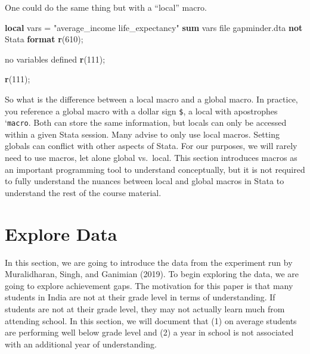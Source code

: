 \documentclass[
]{book}
\newenvironment{Shaded}{\begin{snugshade}}{\end{snugshade}}
\newcommand{\FunctionTok}[1]{\textcolor[rgb]{0.13,0.29,0.53}{\textbf{#1}}}
\newcommand{\KeywordTok}[1]{\textcolor[rgb]{0.13,0.29,0.53}{\textbf{#1}}}
\newcommand{\NormalTok}[1]{#1}
\newcommand{\OtherTok}[1]{\textcolor[rgb]{0.56,0.35,0.01}{#1}}
\newcommand{\StringTok}[1]{\textcolor[rgb]{0.31,0.60,0.02}{#1}}
\begin{document}
\begin{Shaded}
\end{Shaded}

One could do the same thing but with a ``local'' macro.

\begin{Shaded}
\begin{Highlighting}[]
\KeywordTok{local}\NormalTok{ vars = }\StringTok{"average\_income life\_expectancy"}
\KeywordTok{sum} \OtherTok{\textasciigrave{}vars\textquotesingle{}}
\NormalTok{file gapminder.dta }\KeywordTok{not}\NormalTok{ Stata }\KeywordTok{format}
\FunctionTok{r}\NormalTok{(610);}



\NormalTok{no variables defined}
\FunctionTok{r}\NormalTok{(111);}

\FunctionTok{r}\NormalTok{(111);}
\end{Highlighting}
\end{Shaded}

So what is the difference between a local macro and a global macro. In practice, you reference a global macro with a dollar sign \texttt{\$}, a local with apostrophes `\texttt{macro\textquotesingle{}}. Both can store the same information, but locals can only be accessed within a given Stata session. Many advise to only use local macros. Setting globals can conflict with other aspects of Stata. For our purposes, we will rarely need to use macros, let alone global vs.~local. This section introduces macros as an important programming tool to understand conceptually, but it is not required to fully understand the nuances between local and global macros in Stata to understand the rest of the course material.

\section{Explore Data}\label{explore-data}

In this section, we are going to introduce the data from the experiment run by Muralidharan, Singh, and Ganimian (2019). To begin exploring the data, we are going to explore achievement gaps. The motivation for this paper is that many students in India are not at their grade level in terms of understanding. If students are not at their grade level, they may not actually learn much from attending school. In this section, we will document that (1) on average students are performing well below grade level and (2) a year in school is not associated with an additional year of understanding.
\end{document}
